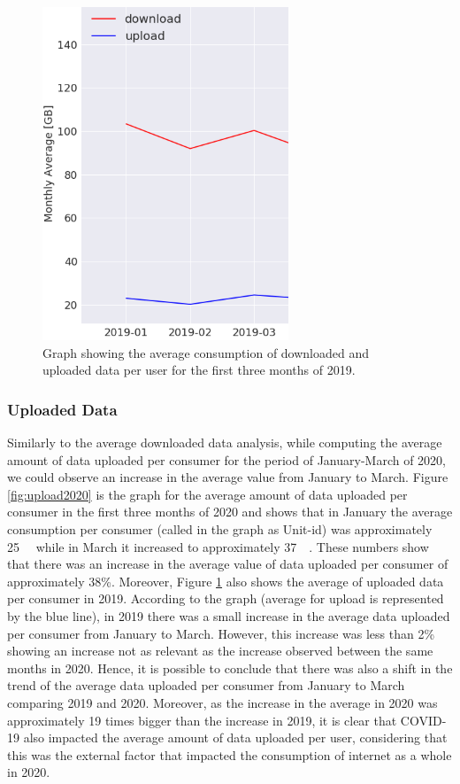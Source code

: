 \documentclass[conference,10pt]{IEEEtran}
\begin{document}
\begin{figure}
\centering
\includegraphics[width=0.5\linewidth]{figs/downloadup2019.PNG}
\caption{Graph showing the average consumption of downloaded and uploaded data per user for the first three months of 2019.}
\label{fig:downloadup2019}
\end{figure}

\subsubsection{Uploaded Data}
\label{sec:upload-data-consumption}

Similarly to the average downloaded data analysis, while computing the average amount of data uploaded per consumer for the period of January-March of 2020, we could observe an increase in the average value from January to March. Figure \ref{fig:upload2020} is the graph for the average amount of data uploaded per consumer in the first three months of 2020 and shows that in January the average consumption per consumer (called in the graph as Unit-id) was approximately \SI{25}{\giga\byte} while in March it increased to approximately \SI{37}{\giga\byte}. These numbers show that there was an increase in the average value of data uploaded per consumer of approximately 38\%. Moreover, Figure \ref{fig:downloadup2019} also shows the average of uploaded data per consumer in 2019. According to the graph (average for upload is represented by the blue line), in 2019 there was a small increase in the average data uploaded per consumer from January to March. However, this increase was less than 2\% showing an increase not as relevant as the increase observed between the same months in 2020. Hence, it is possible to conclude that there was also a shift in the trend of the average data uploaded per consumer from January to March comparing 2019 and 2020. Moreover, as the increase in the average in 2020 was approximately 19 times bigger than the increase in 2019, it is clear that COVID-19 also impacted the average amount of data uploaded per user, considering that this was the external factor that impacted the consumption of internet as a whole in 2020.
\end{document}
